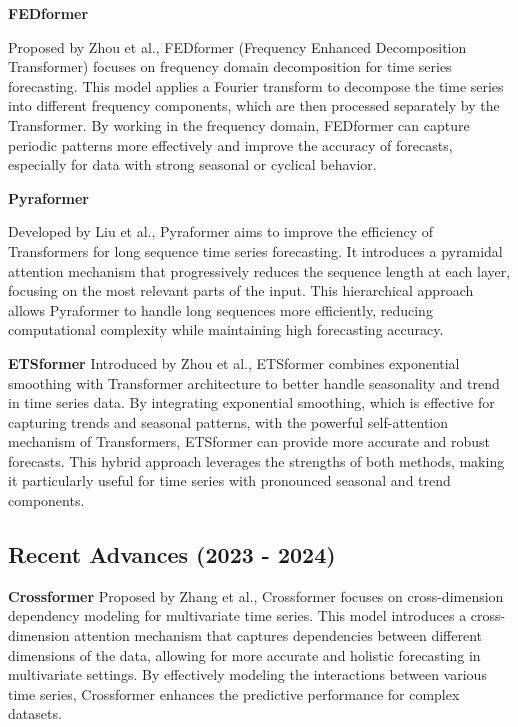 \noindent\textbf
{FEDformer}
 
\noindent Proposed by Zhou et al.\cite{zhou2022fedformerfrequencyenhanceddecomposed}, FEDformer (Frequency Enhanced Decomposition Transformer) focuses on frequency domain decomposition for time series forecasting. This model applies a Fourier transform to decompose the time series into different frequency components, which are then processed separately by the Transformer. By working in the frequency domain, FEDformer can capture periodic patterns more effectively and improve the accuracy of forecasts, especially for data with strong seasonal or cyclical behavior.
\vspace{10pt}


\noindent\textbf
{Pyraformer}

\noindent Developed by Liu et al.\cite{liu2022pyraformer}, Pyraformer aims to improve the efficiency of Transformers for long sequence time series forecasting. It introduces a pyramidal attention mechanism that progressively reduces the sequence length at each layer, focusing on the most relevant parts of the input. This hierarchical approach allows Pyraformer to handle long sequences more efficiently, reducing computational complexity while maintaining high forecasting accuracy.
\vspace{10pt}


\noindent\textbf
{ETSformer}
 Introduced by Zhou et al.\cite{woo2022etsformerexponentialsmoothingtransformers}, ETSformer combines exponential smoothing with Transformer architecture to better handle seasonality and trend in time series data. By integrating exponential smoothing, which is effective for capturing trends and seasonal patterns, with the powerful self-attention mechanism of Transformers, ETSformer can provide more accurate and robust forecasts. This hybrid approach leverages the strengths of both methods, making it particularly useful for time series with pronounced seasonal and trend components.
\vspace{10pt}


\subsection{Recent Advances (2023 - 2024)}
\noindent\textbf
{Crossformer}
 Proposed by Zhang et al.\cite{wang2021crossformerversatilevisiontransformer}, Crossformer focuses on cross-dimension dependency modeling for multivariate time series. This model introduces a cross-dimension attention mechanism that captures dependencies between different dimensions of the data, allowing for more accurate and holistic forecasting in multivariate settings. By effectively modeling the interactions between various time series, Crossformer enhances the predictive performance for complex datasets.
\vspace{10pt}



